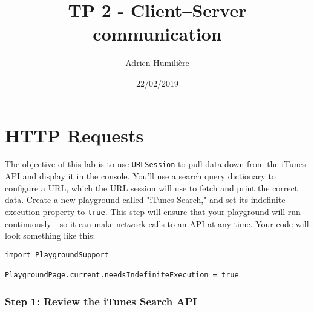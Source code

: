 \documentclass[a4paper,11pt]{scrartcl}
\begin{document}
\newcommand{\mytitle}{\textsf{\textbf{TP 2 - Client–Server communication}}}
\title{\mytitle}
\author{Adrien Humilière}
\date{22/02/2019}

\maketitle

\part{HTTP Requests}

The objective of this lab is to use \texttt{URLSession} to pull data down from the iTunes API and display it in the console. You'll use a search query dictionary to configure a URL, which the URL session will use to fetch and print the correct data.
Create a new playground called "iTunes Search," and set its indefinite execution property to \texttt{true}. This step will ensure that your playground will run continuously—so it can make network calls to an API at any time. Your code will look something like this:
\begin{lstlisting}
import PlaygroundSupport

PlaygroundPage.current.needsIndefiniteExecution = true
\end{lstlisting}

\section*{Step 1: Review the iTunes Search API}
\end{document}
